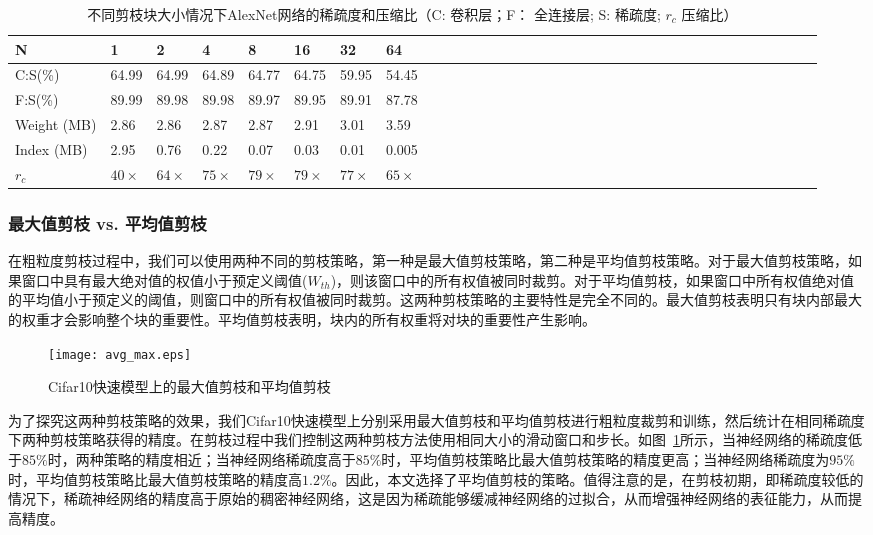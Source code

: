 \begin{table}[h]
\centering
\caption{ 不同剪枝块大小情况下AlexNet网络的稀疏度和压缩比（C: 卷积层；F： 全连接层; S: 稀疏度; $r_c$ 压缩比）}
\label{tab:blocksize}
\begin{tabular}{lll@{~}llll@{~}llll@{~}llll@{~~}llll@{~~}llll@{~~}llll@{~~}lllllllll}
\toprule
N  				& 1 	&  2		& 4			& 8			& 16		& 32 		&64		\\
\midrule
C:S(\%)			& 64.99 &64.99		&64.89		&64.77		&64.75		&59.95		&54.45 	\\
F:S(\%) 		& 89.99	&89.98		&89.98		&89.97		&89.95		&89.91		&87.78	\\
Weight (MB)     & 2.86 	&2.86		&2.87		&2.87		&2.91		&3.01		&3.59	\\
Index (MB)      & 2.95	&0.76		&0.22		&0.07		&0.03		&0.01		&0.005	\\
$r_c$ 			& $40\times$ 	&$64\times$		&$75\times$		&$79\times$		&$79\times$		&$77\times$		&$65\times$	\\
\bottomrule
\end{tabular}
\end{table}

\subsubsection{最大值剪枝 vs. 平均值剪枝}


在粗粒度剪枝过程中，我们可以使用两种不同的剪枝策略，第一种是最大值剪枝策略，第二种是平均值剪枝策略。对于最大值剪枝策略，如果窗口中具有最大绝对值的权值小于预定义阈值($W_{th}$)，则该窗口中的所有权值被同时裁剪。对于平均值剪枝，如果窗口中所有权值绝对值的平均值小于预定义的阈值，则窗口中的所有权值被同时裁剪。这两种剪枝策略的主要特性是完全不同的。最大值剪枝表明只有块内部最大的权重才会影响整个块的重要性。平均值剪枝表明，块内的所有权重将对块的重要性产生影响。

\begin{figure}[h]
  \centering
  \texttt{[image: avg\_max.eps]}
  \caption{Cifar10快速模型上的最大值剪枝和平均值剪枝}
  \label{fig:max_or_avg_pruning}
\end{figure}

为了探究这两种剪枝策略的效果，我们Cifar10快速模型上分别采用最大值剪枝和平均值剪枝进行粗粒度裁剪和训练，然后统计在相同稀疏度下两种剪枝策略获得的精度。在剪枝过程中我们控制这两种剪枝方法使用相同大小的滑动窗口和步长。如图~\ref{fig:max_or_avg_pruning}所示，当神经网络的稀疏度低于$85\%$时，两种策略的精度相近；当神经网络稀疏度高于$85\%$时，平均值剪枝策略比最大值剪枝策略的精度更高；当神经网络稀疏度为$95\%$时，平均值剪枝策略比最大值剪枝策略的精度高$1.2\%$。因此，本文选择了平均值剪枝的策略。值得注意的是，在剪枝初期，即稀疏度较低的情况下，稀疏神经网络的精度高于原始的稠密神经网络，这是因为稀疏能够缓减神经网络的过拟合，从而增强神经网络的表征能力，从而提高精度。


